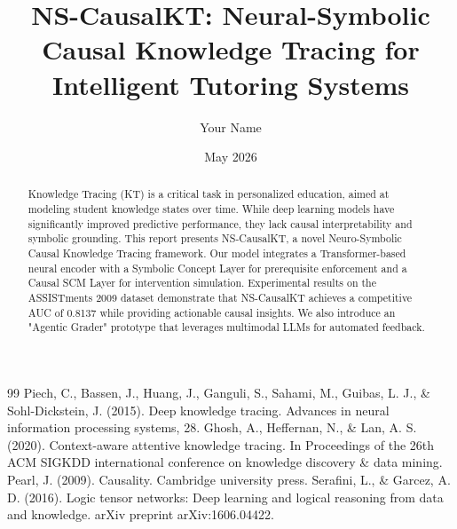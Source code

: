 \documentclass[12pt,a4paper,oneside]{report}
\title{\textbf{NS-CausalKT: Neural-Symbolic Causal Knowledge Tracing for Intelligent Tutoring Systems}}
\author{Your Name}
\date{May 2026}
\begin{document}
\maketitle

\begin{abstract}
Knowledge Tracing (KT) is a critical task in personalized education, aimed at modeling student knowledge states over time. While deep learning models have significantly improved predictive performance, they lack causal interpretability and symbolic grounding. This report presents NS-CausalKT, a novel Neuro-Symbolic Causal Knowledge Tracing framework. Our model integrates a Transformer-based neural encoder with a Symbolic Concept Layer for prerequisite enforcement and a Causal SCM Layer for intervention simulation. Experimental results on the ASSISTments 2009 dataset demonstrate that NS-CausalKT achieves a competitive AUC of 0.8137 while providing actionable causal insights. We also introduce an "Agentic Grader" prototype that leverages multimodal LLMs for automated feedback.
\end{abstract}

\newpage
\tableofcontents
\newpage
\listoffigures
\newpage
\listoftables

\newpage









\begin{thebibliography}{99}
 Piech, C., Bassen, J., Huang, J., Ganguli, S., Sahami, M., Guibas, L. J., \& Sohl-Dickstein, J. (2015). Deep knowledge tracing. Advances in neural information processing systems, 28.
 Ghosh, A., Heffernan, N., \& Lan, A. S. (2020). Context-aware attentive knowledge tracing. In Proceedings of the 26th ACM SIGKDD international conference on knowledge discovery \& data mining.
 Pearl, J. (2009). Causality. Cambridge university press.
 Serafini, L., \& Garcez, A. D. (2016). Logic tensor networks: Deep learning and logical reasoning from data and knowledge. arXiv preprint arXiv:1606.04422.
\end{thebibliography}
\end{document}
